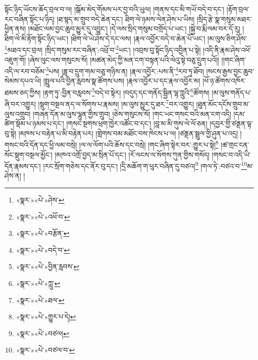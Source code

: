 སྟོང་ཉིད་ཡོངས་ཆོད་བྲལ་བ་ལ། །སྒོམ་མེད་གོམས་པར་བྱ་བའི་ཡུལ། །གནས་དང་མི་གཡོ་བདེ་བ་དང་། །རྟོག་བྲལ་རང་བཞིན་སྟོང་པ་ཉིད། །ཐ་སྙད་མ་གྲུབ་བདེ་ཆེན་དང་། ཐིག་ལེ་ཉམས་ལེན་ཤེས་པ་ཡིས། །སྲིད་རྩེ་སྣ་གསུམ་མཐར་ཕྱིན་ནས། །མཐོང་ལམ་བྱང་ཆུབ་མྱུར་དུ་འབྱུང་། །དེ་ལས་སྲིད་གསུམ་བགྲོད་པ་ཡང་། །སྐྱེ་བ་རྨི་ལམ་བར་དོ་རུ། །ཐིག་ལེ་མི་རྟོག་སྟོང་ཉིད་ཡང་། །ཐིག་ལེ་ཡེ་ཤེས་དེ་དང་ལས། །རྣལ་འབྱོར་བདེ་བ་ཆེན་པོ་ཡང་། །མ་ལུས་ཅིག་ཤོས་\footnote{«སྣར་»«པེ་»ཤེས་}མཐའ་དང་བྲལ། །སྲིད་གསུམ་རང་བཞིན་:འཕྲོ་བ་\footnote{«སྣར་»«པེ་»འཕོ་བ་}ཡང་། །འབྲས་བུ་སྟོང་ཉིད་འབྱིན་པ་སྟེ། །འདི་ནི་རྣམ་ཤེས་འཕོ་འཇུག་གོ། །ཞེས་ལུང་ལས་གསུངས་སོ། །མཚན་མེད་ཀྱི་མན་ངག་བསྟན་པའི་ལེའུ་སྟེ་བཅུ་དྲུག་པའོ།། །།གང་ཞིག་འདི་ལ་རབ་བཅོམ་\footnote{«སྣར་»«པེ་»བརྩོན་}པས། །ཟླ་བ་དྲུག་གམ་བཅུ་གཉིས་ན། །རྣལ་འབྱོར་:པས་ནི་\footnote{«སྣར་»«པེ་»བདེ་བ་}རབ་ཏུ་ཐོབ། །སངས་རྒྱས་བྱང་ཆུབ་སེམས་དཔའ་ཡི། །སྤྲུལ་པའི་བྱིན་རླབས་སྣ་ཚོགས་པས། །རྣལ་འབྱོར་པ་དང་རྣལ་འབྱོར་མ། །ཕོ་ཉ་ཚོགས་འཁོར་ཐམས་ཅད་ཀྱིས། །རྟག་ཏུ་:བྱིན་བརླབས་\footnote{«སྣར་»«པེ་»བྱིན་རླབས་}བདེ་བ་སྟེར། །བདུད་དང་གནོད་སྦྱིན་ལྷ་ཀླུའི་\footnote{«སྣར་»«པེ་»ཀླུ་}ཚོགས། །མ་ལུས་གནོད་པ་ཞི་བར་འགྱུར། །སྡུག་བསྔལ་ནད་ལ་སོགས་པ་རྣམས། །མ་ལུས་མྱུར་དུ་ཐར་\footnote{«སྣར་»«པེ་»ཐལ་}བར་འགྱུར། །ཐུན་མོང་དངོས་གྲུབ་མ་ལུས་འགྲུབ། །གཞན་དོན་མ་ལུས་ལྷུན་གྱིས་གྲུབ། །ཅེས་གསུངས་སོ། །གང་ཡང་གསང་བའི་མན་ངག་འདི། །དམ་ཚིག་སྡོམ་པ་ཉམས་པ་དང་། །གསང་སྔགས་ཕྲག་ཁྱེར་འཚོང་བ་དང་། །བླ་མ་མི་གུས་ལེ་ལོ་ཅན། །དབྱར་གྱི་ཙནྡན་ལྟ་བུ་སྟེ། །མཁས་པ་བརྟེན་པ་མི་བརྟེན་པར། །གླེགས་བམ་མཐོང་བས་ཁེངས་པ་ལ། །ཙནྡན་སྦྲུལ་གྱི་ཤུན་པ་འདྲ། །གསང་བའི་དོན་དང་ཕྱི་ལམ་བསྲེ། །ལ་ལ་ལོག་པའི་ཆོས་དང་བསྲེ། །གང་ཞིག་སྟེར་བར་:གྱུར་པ་སྟེ།\footnote{«སྣར་»«པེ་»གྱུར་པ་དེ།} །ཚ་གྲང་ངན་སོང་སྡུག་བསྔལ་མྱོང་། །མཁའ་འགྲོ་བྱད་མ་སྲིན་པོ་དང་། །རོ་ལངས་ལ་སོགས་ཀུན་གྱིས་གསོད། །གསང་བ་འདི་ཡི་དོན་རྣམས་དང་། །རང་སྲོག་གཅེས་དང་ནོར་བུ་དང་། །དྲི་མཆོག་ག་ཕུར་བཞིན་དུ་བཙའ།\footnote{«སྣར་»«པེ་»བཙལ།} །གལ་ཏེ་:བཙའ་བ་\footnote{«སྣར་»«པེ་»བཙལ་བ་}མ་ཤེས་ན། །
